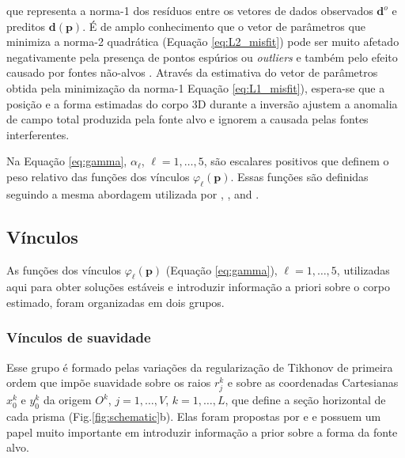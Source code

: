 que representa a norma-1 \citep[e.g.,][p. 331]{aster_etal2019}
dos resíduos entre os vetores de dados observados $\mathbf{d}^{o}$ e preditos $\mathbf{d}(\mathbf{p})$.
É de amplo conhecimento que o vetor de parâmetros que minimiza a norma-2 quadrática (Equação \ref{eq:L2_misfit}) pode ser muito afetado negativamente pela presença de pontos espúrios ou \textit{outliers} e também pelo efeito causado por fontes não-alvos \cite[e.g.,][]{claerbout_muir1973, 
	silva_hohmann1983, scales_gersztenkorn1988, silva_cutrim1989, farquharson_oldenburg1998, 
	uieda_barbosa2012, oliveirajr_etal2015, aster_etal2019}.
Através da estimativa do vetor de parâmetros obtida pela minimização da norma-1 Equação \ref{eq:L1_misfit}), espera-se que a posição e a forma estimadas do corpo 3D durante a inversão ajustem a anomalia de campo total produzida pela fonte alvo e ignorem a causada pelas fontes interferentes.

Na Equação \ref{eq:gamma}, $\alpha_{\ell}$, $\ell = 1, \dots, 5$, são escalares positivos que definem o peso relativo das funções dos vínculos $\varphi_{\ell}(\mathbf{p})$.
Essas funções são definidas seguindo a mesma abordagem utilizada por \citet{oliveirajr_etal2011}, \citet{oliveirajr_barbosa2013}, and \citet{vital_etal2019}.

\subsection{Vínculos}\label{sec:constraints}

As funções dos vínculos $\varphi_{\ell}(\mathbf{p})$ (Equação \ref{eq:gamma}), $\ell = 1, \dots, 5$, utilizadas aqui para obter soluções estáveis e introduzir informação a priori sobre o corpo estimado, foram organizadas em dois grupos.

\subsubsection{Vínculos de suavidade}

Esse grupo é formado pelas variações da regularização de Tikhonov de primeira ordem \cite[][ p. 103]{aster-etal2019} que impõe suavidade sobre os raios $r_{j}^{k}$ e sobre as coordenadas Cartesianas $x_{0}^{k}$ e $y_{0}^{k}$ da origem $O^{k}$, $j = 1, \dots, V$, $k = 1, \dots, L$, que define a seção horizontal de cada prisma (Fig.\ref{fig:schematic}b).
Elas foram propostas por \cite{oliveirajr-etal2011} e \cite{oliveirajr-barbosa2013} e possuem um papel muito importante em introduzir informação a prior sobre a forma da fonte alvo. 


